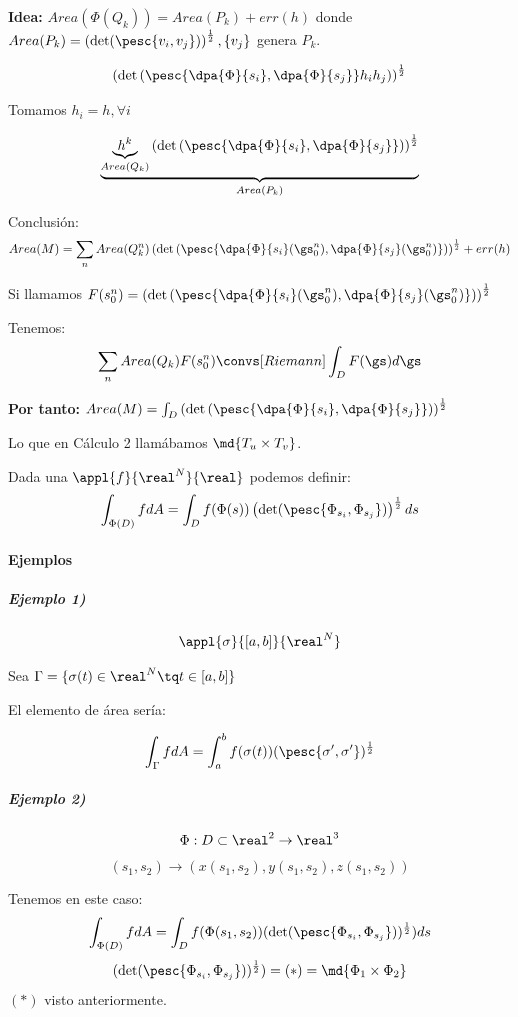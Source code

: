 \textbf{Idea:} $Area(\Phi(Q_k)) = Area(P_k) + err(h)$ donde $Area(P_k) = \left(\det (\pesc{v_i,v_j})\right)^{\frac{1}{2}}, \{v_j\}$ genera $P_k$.


\[\left(\det\left(\pesc{\dpa{\Phi}{s_i},\dpa{\Phi}{s_j}}h_ih_j\right)\right)^{\frac{1}{2}}\]

Tomamos $h_i = h, \forall i$

\[\underbrace{\underbrace{h^k}_{Area(Q_k)} \left(\det\left(\pesc{\dpa{\Phi}{s_i},\dpa{\Phi}{s_j}}\right)\right)^{\frac{1}{2}}}_{Area(P_k)}\]

Conclusión: \[Area(M) = \sum_n Area(Q_k^n) \left(\det\left(\pesc{\dpa{\Phi}{s_i}(\gs_0^n),\dpa{\Phi}{s_j}(\gs_0^n)}\right)\right)^{\frac{1}{2}} + err(h)\]

Si llamamos $F(s_0^n) = \left(\det\left(\pesc{\dpa{\Phi}{s_i}(\gs_0^n),\dpa{\Phi}{s_j}(\gs_0^n)}\right)\right)^{\frac{1}{2}}$ 

Tenemos: \[\sum_n Area(Q_k) F(s_0^n) \convs[Riemann] \int_D F(\gs)d\gs\]

\textbf{Por tanto:} $Area(M) = \int_D \left(\det\left(\pesc{\dpa{\Phi}{s_i},\dpa{\Phi}{s_j}}\right)\right)^{\frac{1}{2}}$

Lo que en Cálculo 2 llamábamos $\md{T_u\times T_v}$.


Dada una $\appl{f}{\real^N}{\real}$ podemos definir: \[\int_{\Phi(D)}f dA = \int_{D}f(\Phi(s)) \left(\det(\pesc{\Phi_{s_i},\Phi_{s_j}})\right)^{\frac{1}{2}} ds\]

\paragraph{Ejemplos}

\subparagraph{Ejemplo 1)}

\[\appl{\sigma}{[a,b]}{\real^N}\]

Sea $\Gamma = \{\sigma(t)\in\real^N\tq t\in[a,b]\}$

El elemento de área sería:

\[\int_{\Gamma} fdA = \int_a^bf(\sigma(t)) (\pesc{\sigma',\sigma'})^{\frac{1}{2}}\]


\subparagraph{Ejemplo 2)}

\[
\Phi : D\subset\real^2\rightarrow \real^3\]
\[(s_1,s_2)\rightarrow (x(s_1,s_2),y(s_1,s_2),z(s_1,s_2))\]

Tenemos en este caso:
\[\int_{\Phi(D)}fdA = \int_D f(\Phi(s_1,s_2)) (\det(\pesc{\Phi_{s_i},\Phi_{s_j}}))^{\frac{1}{2}})ds\]
\[(\det(\pesc{\Phi_{s_i},\Phi_{s_j}}))^{\frac{1}{2}}) = (*) = \md{\Phi_1 \times \Phi_2}\]
$(*)$ visto anteriormente.

